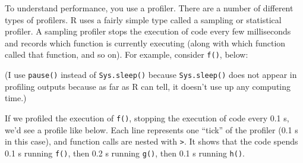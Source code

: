 \begin{Shaded}
\begin{Highlighting}[]
\NormalTok{(}\NormalTok{)}
\end{Highlighting}
\end{Shaded}


To understand performance, you use a profiler. There are a number of
different types of profilers. R uses a fairly simple type called a
sampling or statistical profiler. A sampling profiler stops the
execution of code every few milliseconds and records which function is
currently executing (along with which function called that function, and
so on). For example, consider \texttt{f()}, below: 

\begin{Shaded}
\begin{Highlighting}[]
\StringTok{ }
  \NormalTok{(}\NormalTok{)}
  \NormalTok{()}
  \NormalTok{()}
\NormalTok{\}}
\StringTok{ }
  \NormalTok{(}\NormalTok{)}
  \NormalTok{()}
\NormalTok{\}}
\StringTok{ }
  \NormalTok{(}\NormalTok{)}
\NormalTok{\}}
\end{Highlighting}
\end{Shaded}

(I use \texttt{pause()} instead of \texttt{Sys.sleep()} because
\texttt{Sys.sleep()} does not appear in profiling outputs because as far
as R can tell, it doesn't use up any computing time.) 

If we profiled the execution of \texttt{f()}, stopping the execution of
code every 0.1 s, we'd see a profile like below. Each line represents
one ``tick'' of the profiler (0.1 s in this case), and function calls
are nested with \texttt{\textgreater{}}. It shows that the code spends
0.1 s running \texttt{f()}, then 0.2 s running \texttt{g()}, then 0.1 s
running \texttt{h()}.

